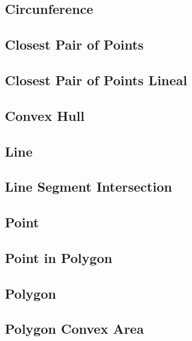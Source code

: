 \documentclass[10pt]{article}
\begin{document}
\subsection{\texorpdfstring{{Circunference}}{{Circunference}}}

\subsection{\texorpdfstring{{Closest Pair of Points}}{{Closest Pair of Points}}}

\subsection{\texorpdfstring{{Closest Pair of Points Lineal}}{{Closest Pair of Points Lineal}}}

\subsection{\texorpdfstring{{Convex Hull}}{{Convex Hull}}}

\subsection{\texorpdfstring{{Line}}{{Line}}}

\subsection{\texorpdfstring{{Line Segment Intersection}}{{Line Segment Intersection}}}

\subsection{\texorpdfstring{{Point}}{{Point}}}

\subsection{\texorpdfstring{{Point in Polygon}}{{Point in Polygon}}}

\subsection{\texorpdfstring{{Polygon}}{{Polygon}}}

\subsection{\texorpdfstring{{Polygon Convex Area}}{{Polygon Convex Area}}}

\end{document}
